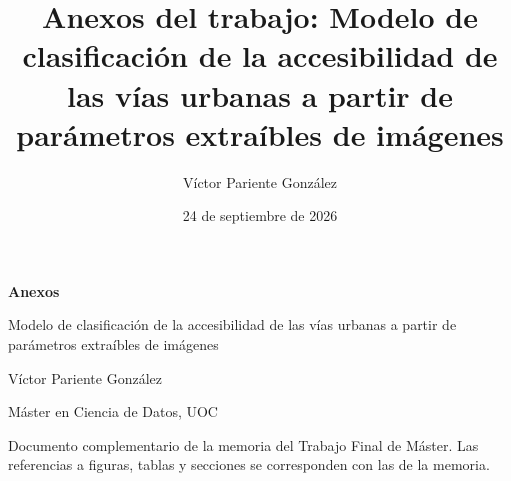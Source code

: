 \documentclass[IB]{TFUOC}
\title{Anexos del trabajo: Modelo de clasificación de la accesibilidad de las vías urbanas a partir de parámetros extraíbles de imágenes}
\author{Víctor Pariente González}
\date{24 de septiembre de 2026}
\begin{document}
\begin{titlepage}
  \centering
  \vspace*{3cm}
  {\Large\color{uoc-azul}\bfseries Anexos\par}
  \vspace{1cm}
  {\large Modelo de clasificación de la accesibilidad de las vías urbanas a partir de parámetros extraíbles de imágenes\par}
  \vspace{1.5cm}
  Víctor Pariente González\par
  Máster en Ciencia de Datos, UOC\par
  \vspace{1cm}
  \small Documento complementario de la memoria del Trabajo Final de Máster. Las referencias a figuras, tablas y secciones se corresponden con las de la memoria.
\end{titlepage}

{\hypersetup{linkcolor=black}\tableofcontents}

\appendix





\printbibliography[heading=bibintoc]
\end{document}

